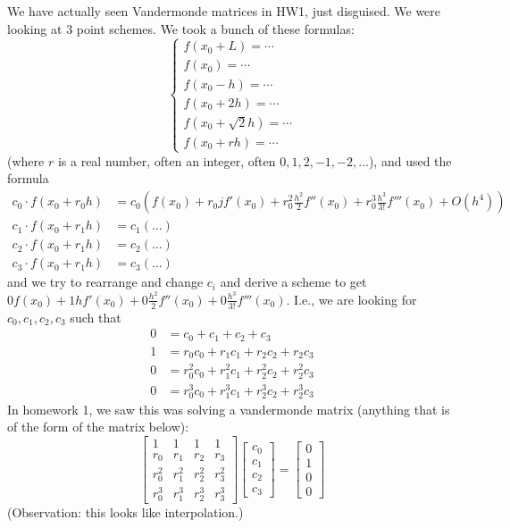 \documentclass{article}
\theoremstyle{plain}
\theoremstyle{remark}
\begin{document}
We have actually seen Vandermonde matrices in HW1, just disguised.
We were looking at $3$ point schemes.
We took a bunch of these formulas:
\[
	\begin{cases}
		f(x_0 + L) = \cdots\\
		f(x_0) = \cdots\\
		f(x_0 - h) = \cdots\\
		f(x_0 + 2h) = \cdots\\
		f(x_0 + \sqrt{2}h) = \cdots\\
		f(x_0 + rh) = \cdots
	\end{cases}
\]
(where $r$ is a real number, often an integer, often $0,1,2,-1,-2,\dots$),
and used the formula
\begin{align*}
	c_0\cdot f(x_0 + r_0h) &= c_0\left(f(x_0) + r_0jf'(x_0) + r_0^2\frac{h^2}{2}f''(x_0)
	+ r_0^3\frac{h^3}{3!}f'''(x_0) + O(h^4)\right)\\
		c_1 \cdot f(x_0 + r_1h) &= c_1(\dots)\\
		c_2 \cdot f(x_0 + r_1h) &= c_2(\dots)\\
		c_3 \cdot f(x_0 + r_1h) &= c_3(\dots)
\end{align*}
and we try to rearrange and change $c_i$ and derive a scheme to get
$0f(x_0) + 1hf'(x_0) + 0\frac{h^2}{2}f''(x_0) + 0\frac{h^3}{3!}f'''(x_0)$.
I.e., we are looking for $c_0,c_1,c_2,c_3$ such that
\begin{align*}
	0 &= c_0 + c_1 + c_2 + c_3\\
	1 &= r_0c_0 + r_1c_1 + r_2c_2 + r_2c_3\\
	0 &= r_0^2c_0 + r_1^2c_1 + r_2^2c_2 + r_2^2c_3\\
	0 &= r_0^3c_0 + r_1^3c_1 + r_2^3c_2 + r_2^3c_3
\end{align*}
In homework 1, we saw this was solving a vandermonde matrix
(anything that is of the form of the matrix below):
\[
	\begin{bmatrix}
		1 & 1 & 1 & 1\\
		r_0 & r_1 & r_2 & r_3\\
		r_0^2 & r_1^2 & r_2^2 & r_3^2\\
		r_0^3 & r_1^3 & r_2^3 & r_3^3
	\end{bmatrix}
	\begin{bmatrix} c_0 \\ c_1 \\ c_2 \\ c_3 \end{bmatrix}
	= \begin{bmatrix} 0 \\ 1 \\ 0 \\ 0 \end{bmatrix}
\]
(Observation: this looks like interpolation.)
\end{document}
